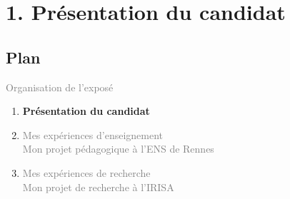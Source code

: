 \documentclass[11pt,english,ignorenonframetext,]{beamer}
\begin{document}







\section{\hfill{}1. Présentation du candidat\hfill{}}

\subsection{\hfill{}Plan\hfill{}}

\begin{frame}{\textcolor{gray}{Organisation de l'exposé}}

\begin{enumerate}
\item
\alert{\textbf{%
  Présentation du candidat
}}
\vspace*{25pt}

\item
\textcolor{gray}{
  Mes expériences d'enseignement\\
  Mon projet pédagogique à l'ENS de Rennes
}
\vspace*{25pt}

\item
\textcolor{gray}{
  Mes expériences de recherche\\
  Mon projet de recherche à l'IRISA
}
\end{enumerate}

\end{frame}
\end{document}
